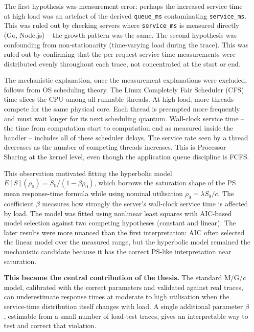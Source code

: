 The first hypothesis was measurement error: perhaps the increased service time at high load was an artefact of the derived \texttt{queue\_ms} contaminating \texttt{service\_ms}. This was ruled out by checking servers where \texttt{service\_ms} is measured directly (Go, Node.js) -- the growth pattern was the same. The second hypothesis was confounding from non-stationarity (time-varying load during the trace). This was ruled out by confirming that the per-request service time measurements were distributed evenly throughout each trace, not concentrated at the start or end.

The mechanistic explanation, once the measurement explanations were excluded, follows from OS scheduling theory. The Linux Completely Fair Scheduler (CFS) time-slices the CPU among all runnable threads. At high load, more threads compete for the same physical core. Each thread is preempted more frequently and must wait longer for its next scheduling quantum. Wall-clock service time -- the time from computation start to computation end as measured inside the handler -- includes all of these scheduler delays. The service rate seen by a thread decreases as the number of competing threads increases. This is Processor Sharing at the kernel level, even though the application queue discipline is FCFS.

This observation motivated fitting the hyperbolic model $E[S](\rho_0) = S_0 / (1 - \beta\rho_0)$, which borrows the saturation shape of the PS mean response-time formula while using nominal utilisation $\rho_0=\lambda S_0/c$. The coefficient $\beta$ measures how strongly the server's wall-clock service time is affected by load. The model was fitted using nonlinear least squares with AIC-based model selection against two competing hypotheses (constant and linear). The later results were more nuanced than the first interpretation: AIC often selected the linear model over the measured range, but the hyperbolic model remained the mechanistic candidate because it has the correct PS-like interpretation near saturation.

\textbf{This became the central contribution of the thesis.} The standard M/G/$c$ model, calibrated with the correct parameters and validated against real traces, can underestimate response times at moderate to high utilisation when the service-time distribution itself changes with load. A single additional parameter $\beta$, estimable from a small number of load-test traces, gives an interpretable way to test and correct that violation.

